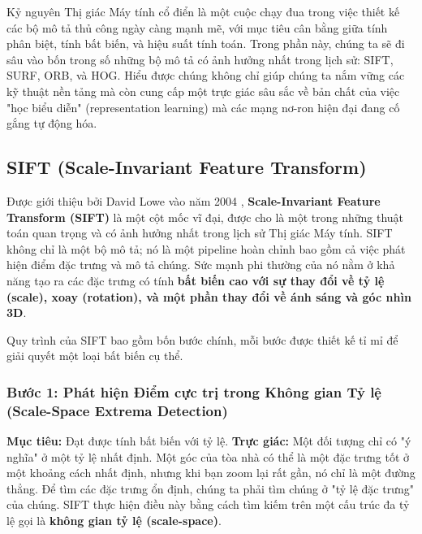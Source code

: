 Kỷ nguyên Thị giác Máy tính cổ điển là một cuộc chạy đua trong việc thiết kế các bộ mô tả thủ công ngày càng mạnh mẽ, với mục tiêu cân bằng giữa tính phân biệt, tính bất biến, và hiệu suất tính toán. Trong phần này, chúng ta sẽ đi sâu vào bốn trong số những bộ mô tả có ảnh hưởng nhất trong lịch sử: SIFT, SURF, ORB, và HOG. Hiểu được chúng không chỉ giúp chúng ta nắm vững các kỹ thuật nền tảng mà còn cung cấp một trực giác sâu sắc về bản chất của việc "học biểu diễn" (representation learning) mà các mạng nơ-ron hiện đại đang cố gắng tự động hóa.

\subsection{SIFT (Scale-Invariant Feature Transform)}
\label{subsec:sift}

Được giới thiệu bởi David Lowe vào năm 2004 \cite{Lowe2004}, \textbf{Scale-Invariant Feature Transform (SIFT)} là một cột mốc vĩ đại, được cho là một trong những thuật toán quan trọng và có ảnh hưởng nhất trong lịch sử Thị giác Máy tính. SIFT không chỉ là một bộ mô tả; nó là một pipeline hoàn chỉnh bao gồm cả việc phát hiện điểm đặc trưng và mô tả chúng. Sức mạnh phi thường của nó nằm ở khả năng tạo ra các đặc trưng có tính \textbf{bất biến cao với sự thay đổi về tỷ lệ (scale), xoay (rotation), và một phần thay đổi về ánh sáng và góc nhìn 3D}.

Quy trình của SIFT bao gồm bốn bước chính, mỗi bước được thiết kế tỉ mỉ để giải quyết một loại bất biến cụ thể.

\subsubsection{Bước 1: Phát hiện Điểm cực trị trong Không gian Tỷ lệ (Scale-Space Extrema Detection)}
\label{subsubsec:sift_scale_space}
\textbf{Mục tiêu:} Đạt được tính bất biến với tỷ lệ.
\textbf{Trực giác:} Một đối tượng chỉ có "ý nghĩa" ở một tỷ lệ nhất định. Một góc của tòa nhà có thể là một đặc trưng tốt ở một khoảng cách nhất định, nhưng khi bạn zoom lại rất gần, nó chỉ là một đường thẳng. Để tìm các đặc trưng ổn định, chúng ta phải tìm chúng ở "tỷ lệ đặc trưng" của chúng. SIFT thực hiện điều này bằng cách tìm kiếm trên một cấu trúc đa tỷ lệ gọi là \textbf{không gian tỷ lệ (scale-space)}.

